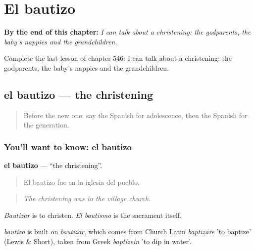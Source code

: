 
\chapter{El bautizo}
\label{ch:es-el-bautizo}

\begin{chapteropening}
\textbf{By the end of this chapter:} \emph{I can talk about a christening: the godparents, the baby's nappies and the grandchildren.}

Complete the last lesson of chapter 546: I can talk about a christening: the godparents, the baby's nappies and the grandchildren.
\end{chapteropening}

\section[el bautizo]{el bautizo — the christening}

\label{lesson:ES-C546-bautizo}



\begin{quote}
Before the new one: say the Spanish for adolescence, then the Spanish for the generation.
\end{quote}

\subsection*{You'll want to know: el bautizo}
\textbf{el bautizo} — \textquotedblleft{}the christening\textquotedblright{}.

\begin{quote}
El bautizo fue en la iglesia del pueblo.
\end{quote}

\begin{quote}
\emph{The christening was in the village church.}
\end{quote}

\emph{Bautizar} is to christen. \emph{El bautismo} is the sacrament itself.

\begin{cousinweb}
\emph{bautizo} is built on \emph{bautizar}, which comes from Church Latin \emph{baptīzāre} 'to baptize' (Lewis \& Short), taken from Greek \emph{baptízein} 'to dip in water'.
\end{cousinweb}

